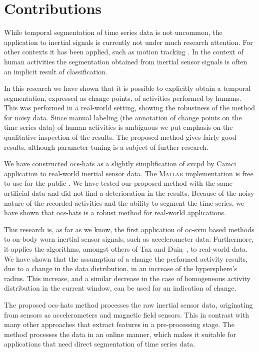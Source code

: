 \section{Contributions}\label{sec:main_findings}
While temporal segmentation of time series data is not uncommon, the application to inertial signals is currently not under much research attention.
For other contexts it has been applied, such as motion tracking \cite{barbivc2004segmenting,li2007segmentation}.
In the context of human activities the segmentation obtained from inertial sensor signals is often an implicit result of classification.

In this research we have shown that it is possible to explicitly obtain a temporal segmentation, expressed as change points, of activities performed by humans.
This was performed in a real-world setting, showing the robustness of the method for noisy data.
Since manual labeling (the annotation of change points on the time series data) of human activities is ambiguous we put emphasis on the qualitative inspection of the results.
The proposed method gives fairly good results, although parameter tuning is a subject of further research.

We have constructed \gls{ocs-hats} as a slightly simplification of \gls{svcpd} by Camci~\cite{camci2010change} application to real-world inertial sensor data.
The \textsc{Matlab} implementation is free to use for the public \cite{vlasveld2014hats}.
We have tested our proposed method with the same artificial data and did not find a deterioration in the results.
Because of the noisy nature of the recorded activities and the ability to segment the time series, we have shown that \gls{ocs-hats} is a robust method for real-world applications.

This research is, as far as we know, the first application of \gls{oc-svm} based methods to on-body worn inertial sensor signals, such as accelerometer data.
Furthermore, it applies the algorithms, amongst others of Tax and Duin~\cite{tax1999support}, to real-world data.
We have shown that the assumption of a change the performed activity results, due to a change in the data distribution, in an increase of the hypersphere's radius.
This increase, and a similar decrease in the case of homogeneous activity distribution in the current window, can be used for an indication of change.

The proposed \gls{ocs-hats} method processes the raw inertial sensor data, originating from sensors as accelerometers and magnetic field sensors.
This in contrast with many other approaches that extract features in a pre-processing stage.
The method processes the data in an online manner, which makes it suitable for applications that need direct segmentation of time series data.

